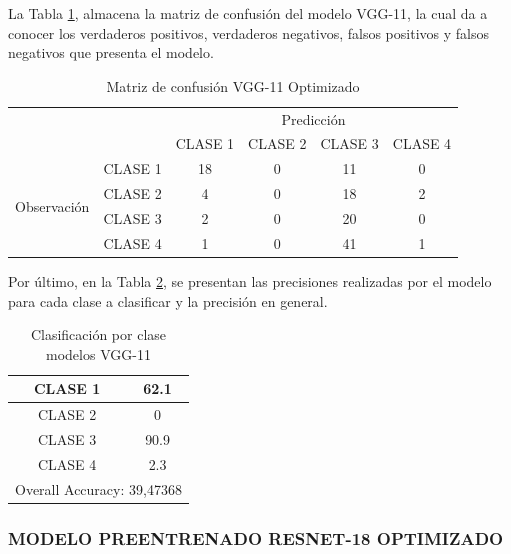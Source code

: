 \newpage
La Tabla \ref{tab:MC_VGG11_OPT}, almacena la matriz de confusión del modelo VGG-11, la cual da a conocer los verdaderos positivos, verdaderos negativos, falsos positivos y falsos negativos que presenta el modelo.
\begin{table}[htbp]
	\centering
	\begin{tabular}{|c|l|c|c|c|c|}
		\hline
		\multicolumn{2}{|c|}{\multirow{2}[4]{*}{}} & \multicolumn{4}{c|}{Predicción} \bigstrut\\
		\cline{3-6}    \multicolumn{2}{|c|}{} & CLASE 1 & CLASE 2 & CLASE 3 & CLASE 4 \bigstrut\\
		\hline
		\multirow{4}[8]{*}{\begin{sideways}Observación\end{sideways}} & CLASE 1 & 18     & 0     & 11    & 0 \bigstrut\\
		\cline{2-6}          & CLASE 2 & 4     & 0     & 18    & 2 \bigstrut\\
		\cline{2-6}          & CLASE 3 & 2     & 0     & 20    & 0 \bigstrut\\
		\cline{2-6}          & CLASE 4 & 1     & 0     & 41    & 1 \bigstrut\\
		\hline
	\end{tabular}%
	\caption{Matriz de confusión VGG-11 Optimizado }
	\label{tab:MC_VGG11_OPT}%
\end{table}%

Por último, en la Tabla \ref{tab:VGG11optclases}, se presentan las precisiones realizadas por el modelo para cada clase a clasificar y la precisión en general.

\begin{table}[htbp]
	\centering
	\begin{tabular}{|c|c|}
		\hline
		CLASE 1 & 62.1 \bigstrut\\
		\hline
		CLASE 2 & 0 \bigstrut\\
		\hline
		CLASE 3 & 90.9 \bigstrut\\
		\hline
		CLASE 4 & 2.3 \bigstrut\\
		\hline
		\multicolumn{2}{|c|}{Overall Accuracy: 39,47368} \bigstrut\\
		\hline
	\end{tabular}%
	\caption{Clasificación por clase modelos VGG-11}
	\label{tab:VGG11optclases}%
\end{table}%

\newpage	
\subsubsection{\MakeUppercase{Modelo Preentrenado ResNet-18 Optimizado}}

